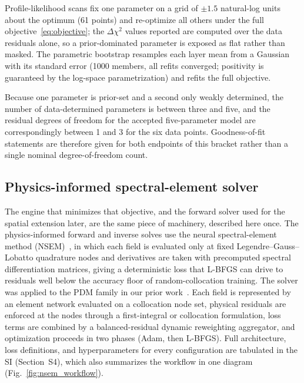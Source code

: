 \documentclass[pdflatex,sn-nature]{sn-jnl}
\begin{document}
Profile-likelihood scans fix one parameter on a grid of $\pm1.5$
natural-log units about the optimum (61 points) and re-optimize all
others under the full objective~\eqref{eq:objective}; the
$\Delta\chi^2$ values reported are computed over the data residuals
alone, so a prior-dominated parameter is exposed as flat rather than
masked. The parametric bootstrap resamples each layer mean from a
Gaussian with its standard error (1000 members, all refits converged;
positivity is guaranteed by the log-space parametrization) and refits
the full objective.

Because one parameter is prior-set and a second only weakly determined,
the number of data-determined parameters is between three and five, and the residual
degrees of freedom for the accepted five-parameter model are
correspondingly between 1 and 3 for the six data points. Goodness-of-fit
statements are therefore given for both endpoints of this
bracket rather than a single nominal degree-of-freedom count.

\subsection{Physics-informed spectral-element solver}\label{sec:nsem}

The engine that minimizes that objective, and the forward solver used
for the spatial extension later, are the same piece of machinery,
described here once. The physics-informed forward and inverse solves use
the neural
spectral-element method (NSEM)~\citep{feugmo2026nsem}, in which each
field is evaluated only at fixed Legendre--Gauss--Lobatto quadrature
nodes and derivatives are taken with precomputed spectral
differentiation matrices, giving a deterministic loss that L-BFGS can
drive to residuals well below the accuracy floor of random-collocation
training. The solver was applied to the PDM family in our prior
work~\citep{farooqi2025pinnpdm}. Each field is represented by an
element network evaluated on a collocation node set, physical residuals
are enforced at the nodes through a first-integral or collocation
formulation, loss terms are combined by a balanced-residual dynamic
reweighting aggregator, and optimization proceeds in two phases (Adam,
then L-BFGS). Full architecture, loss definitions, and hyperparameters
for every configuration are tabulated in the SI (Section~S4), which also
summarizes the workflow in one diagram (Fig.~\ref{fig:nsem_workflow}).
\end{document}
